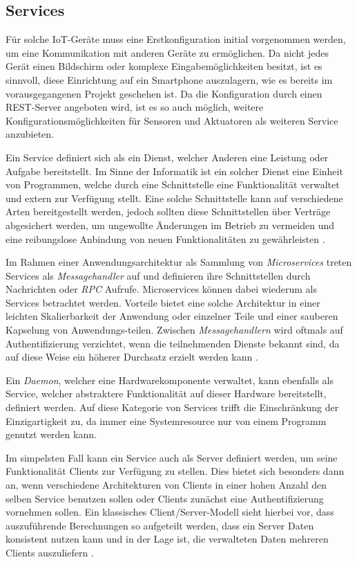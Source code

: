     \subsection{Services}
    Für solche IoT-Geräte muss eine Erstkonfiguration initial vorgenommen werden, um eine Kommunikation mit anderen Geräte zu ermöglichen. Da nicht jedes Gerät einen Bildschirm oder komplexe Eingabemöglichkeiten besitzt, ist es sinnvoll, diese Einrichtung auf ein Smartphone auszulagern, wie es bereits im vorausgegangenen Projekt geschehen ist. Da die Konfiguration durch einen REST-Server angeboten wird, ist es so auch möglich, weitere Konfigurationsmöglichkeiten für Sensoren und Aktuatoren als weiteren Service anzubieten.
    
    Ein Service definiert sich als ein Dienst, welcher Anderen eine Leistung oder Aufgabe bereitstellt. Im Sinne der Informatik ist ein solcher Dienst eine Einheit von Programmen, welche durch eine Schnittstelle eine Funktionalität verwaltet und extern zur Verfügung stellt. Eine solche Schnittstelle kann auf verschiedene Arten bereitgestellt werden, jedoch sollten diese Schnittstellen über Verträge abgesichert werden, um ungewollte Änderungen im Betrieb zu vermeiden und eine reibungslose Anbindung von neuen Funktionalitäten zu gewährleisten \cite[S.11]{finger}.
    
    Im Rahmen einer Anwendungsarchitektur als Sammlung von {\it Microservices} treten Services als {\it Messagehandler} auf und definieren ihre Schnittstellen durch Nachrichten oder {\it RPC} Aufrufe. Microservices können dabei wiederum als Services betrachtet werden. Vorteile bietet eine solche Architektur in einer leichten Skalierbarkeit der Anwendung oder einzelner Teile und einer sauberen Kapselung von Anwendungs-teilen. Zwischen {\it Messagehandlern} wird oftmals auf Authentifizierung verzichtet, wenn die teilnehmenden Dienste bekannt sind, da auf diese Weise ein höherer Durchsatz erzielt werden kann \cite{microservices}.
    
    Ein {\it Daemon}, welcher eine Hardwarekomponente verwaltet, kann ebenfalls als Service, welcher abstraktere Funktionalität auf dieser Hardware bereitstellt, definiert werden. Auf diese Kategorie von Services trifft die Einschränkung der Einzigartigkeit zu, da immer eine Systemresource nur von einem Programm genutzt werden kann.
    
    Im simpelsten Fall kann ein Service auch als Server definiert werden, um seine Funktionalität Clients zur Verfügung zu stellen. Dies bietet sich besonders dann an, wenn verschiedene Architekturen von Clients in einer hohen Anzahl den selben Service benutzen sollen oder Clients zunächst eine Authentifizierung vornehmen sollen. 
    Ein klassisches Client/Server-Modell sieht hierbei vor, dass auszuführende Berechnungen so aufgeteilt werden, dass ein Server Daten konsistent nutzen kann und in der Lage ist, die verwalteten Daten mehreren Clients auszuliefern \cite[S.8]{abts}.
        
